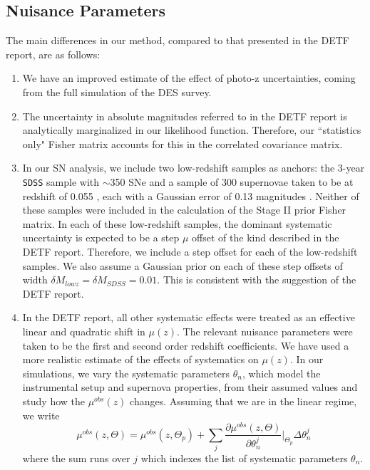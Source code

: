 \documentclass[preprint2]{aastex}    %
\begin{document}
\subsection{Nuisance Parameters}
The main differences in our method, compared to that presented in the DETF report, are
as follows:
\begin{enumerate}
\item We have an improved estimate of the effect of photo-z uncertainties, coming from 
the full simulation of the DES survey. 
\item The uncertainty in absolute magnitudes referred to in the DETF report 
is analytically marginalized in our likelihood function. Therefore, our 
``statistics only" Fisher matrix accounts for this in the correlated covariance matrix.
\item In our SN analysis, we include two low-redshift samples as anchors: the 3-year 
\verb=SDSS= sample with $\sim$350 SNe and a sample of 300 supernovae taken to be at redshift 
of 0.055 \citep{li11}, each with a Gaussian error of 0.13 magnitudes . 
Neither of these samples were included in the calculation of 
the Stage II prior Fisher matrix. In each of these low-redshift 
samples, the dominant systematic uncertainty is expected to be a step $\mu$ offset 
of the kind described in the DETF report. Therefore, we include a step offset for each 
of the low-redshift samples. We also assume a Gaussian prior on each of these step offsets of width 
$\delta M_{lowz}= \delta M_{SDSS} =0.01$. This is consistent with the suggestion of the 
DETF report.
\item In the DETF report, all other systematic effects were treated as an effective linear 
and quadratic shift in $\mu(z)$. The relevant nuisance parameters were taken to be the first 
and second order redshift coefficients. We have used a more realistic estimate of the
effects of systematics on $\mu(z)$. In our simulations, we vary the
systematic parameters $\theta_n$, which model the instrumental setup and
supernova properties, from their assumed values and study
how the $\mu^{obs}(z)$ changes. Assuming that we are in the linear regime,
we write
\begin{equation}
\mu^{obs}(z,\Theta) = \mu^{obs}(z,\Theta_p) +
\sum_{j}\frac{\partial \mu^{obs}(z,\Theta)}{\partial \theta_n^j}
\bigg\vert_{\Theta_p}\Delta\theta_n^j
\end{equation}
where the sum runs over $j$ which indexes the list of systematic parameters $\theta_n$.
\end{enumerate}
\end{document}
